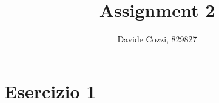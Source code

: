 \documentclass[a4paper,12pt, oneside]{book}
\title{Assignment 2}
\author{Davide Cozzi, 829827}
\date{}
\begin{document}
\maketitle

\newtheorem{teorema}{Teorema}
\newtheorem{definizione}{Definizione}
\newtheorem{esempio}{Esempio}
\newtheorem{corollario}{Corollario}
\newtheorem{lemma}{Lemma}
\newtheorem{osservazione}{Osservazione}
\newtheorem{nota}{Nota}
\newtheorem{esercizio}{Esercizio}

\renewcommand{\chaptermark}[1]{%
  \markboth{\chaptername
    \ \thechapter.\ #1}{}}
\renewcommand{\sectionmark}[1]{\markright{\thesection.\ #1}}
\chapter{Esercizio 1}
\end{document}
